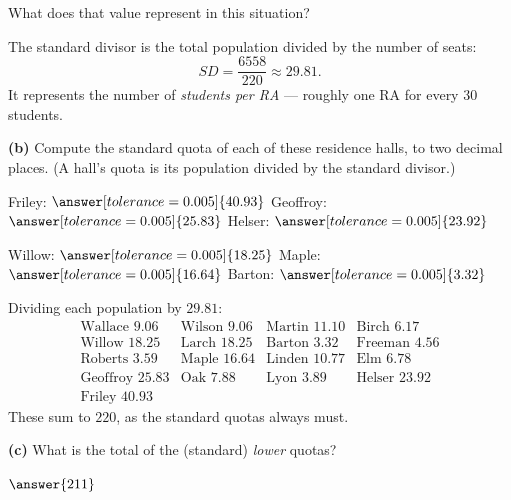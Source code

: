 \documentclass[12pt]{ximera}
\begin{document}
\begin{problem}
\begin{prompt}
\smallskip
What does that value represent in this situation?
\begin{multipleChoice}
\end{multipleChoice}

\begin{feedback}
The standard divisor is the total population divided by the number of seats:
\[ SD = \frac{6558}{220} \approx 29.81. \]
It represents the number of \emph{students per RA} --- roughly one RA for every $30$
students.
\end{feedback}
\end{prompt}

\begin{prompt}
\textbf{(b)} Compute the standard quota of each of these residence halls, to two
decimal places. (A hall's quota is its population divided by the standard divisor.)

Friley: $\answer[tolerance=0.005]{40.93}$ \qquad
Geoffroy: $\answer[tolerance=0.005]{25.83}$ \qquad
Helser: $\answer[tolerance=0.005]{23.92}$

\smallskip
Willow: $\answer[tolerance=0.005]{18.25}$ \qquad
Maple: $\answer[tolerance=0.005]{16.64}$ \qquad
Barton: $\answer[tolerance=0.005]{3.32}$

\begin{feedback}
Dividing each population by $29.81$:
\[
\begin{array}{llll}
\text{Wallace } 9.06 & \text{Wilson } 9.06 & \text{Martin } 11.10 & \text{Birch } 6.17\\
\text{Willow } 18.25 & \text{Larch } 18.25 & \text{Barton } 3.32 & \text{Freeman } 4.56\\
\text{Roberts } 3.59 & \text{Maple } 16.64 & \text{Linden } 10.77 & \text{Elm } 6.78\\
\text{Geoffroy } 25.83 & \text{Oak } 7.88 & \text{Lyon } 3.89 & \text{Helser } 23.92\\
\text{Friley } 40.93 & & &
\end{array}
\]
These sum to $220$, as the standard quotas always must.
\end{feedback}
\end{prompt}

\begin{prompt}
\textbf{(c)} What is the total of the (standard) \emph{lower} quotas?

$\answer{211}$


\end{prompt}
\end{problem}
\end{document}
